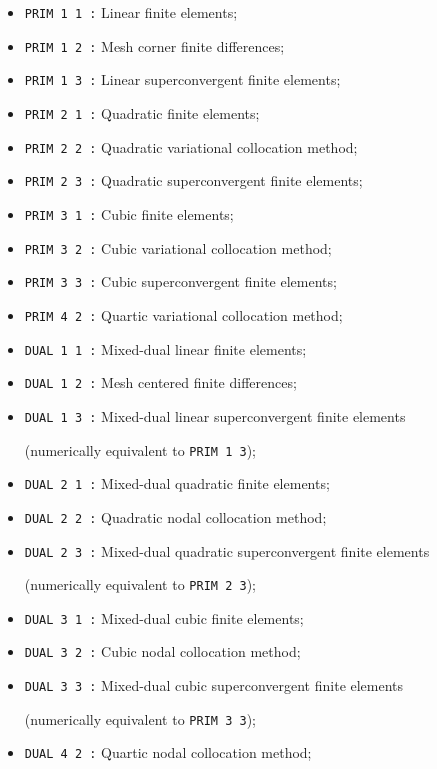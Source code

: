 \begin{itemize}

\item {\tt PRIM 1 1~:} Linear finite elements;

\item {\tt PRIM 1 2~:} Mesh corner finite differences;

\item {\tt PRIM 1 3~:} Linear superconvergent finite elements;

\item {\tt PRIM 2 1~:} Quadratic finite elements;

\item {\tt PRIM 2 2~:} Quadratic variational collocation method;

\item {\tt PRIM 2 3~:} Quadratic superconvergent finite elements;

\item {\tt PRIM 3 1~:} Cubic finite elements;

\item {\tt PRIM 3 2~:} Cubic variational collocation method;

\item {\tt PRIM 3 3~:} Cubic superconvergent finite elements;

\item {\tt PRIM 4 2~:} Quartic variational collocation method;

\item {\tt DUAL 1 1~:} Mixed-dual linear finite elements;

\item {\tt DUAL 1 2~:} Mesh centered finite differences;

\item {\tt DUAL 1 3~:} Mixed-dual linear superconvergent finite elements

(numerically equivalent to {\tt PRIM~1~3});

\item {\tt DUAL 2 1~:} Mixed-dual quadratic finite elements;

\item {\tt DUAL 2 2~:} Quadratic nodal collocation method;

\item {\tt DUAL 2 3~:} Mixed-dual quadratic superconvergent finite elements

(numerically equivalent to {\tt PRIM~2~3});

\item {\tt DUAL 3 1~:} Mixed-dual cubic finite elements;

\item {\tt DUAL 3 2~:} Cubic nodal collocation method;

\item {\tt DUAL 3 3~:} Mixed-dual cubic superconvergent finite elements

(numerically equivalent to {\tt PRIM~3~3});

\item {\tt DUAL 4 2~:} Quartic nodal collocation method;

\end{itemize}
\eject
